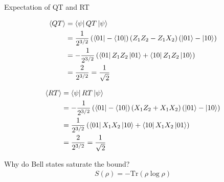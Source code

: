 \documentclass[aspectratio=1610]{beamer}					%
\begin{document}
\begin{frame}{Expectation of QT and RT}

\begin{align*}
\langle QT \rangle &= \bra{\psi}QT\ket{\psi}\\
&= \frac{1}{2^{3/2}}\left(\bra{01} - \bra{10}\right) \left(Z_{1}Z_{2}-Z_{1}X_{2}\right)\left(\ket{01} - \ket{10}\right)\\
&= -\frac{1}{2^{3/2}}\left(\bra{01}Z_{1}Z_{2}\ket{01} + \bra{10}Z_{1}Z_{2}\ket{10}\right)\\
&= \frac{2}{2^{3/2}} = \frac{1}{\sqrt{2}}
\end{align*}

\begin{align*}
\langle RT \rangle &= \bra{\psi}RT\ket{\psi}\\
&= -\frac{1}{2^{3/2}}\left(\bra{01} - \bra{10}\right) \left(X_{1}Z_{2}+X_{1}X_{2}\right)\left(\ket{01} - \ket{10}\right)\\
&= \frac{1}{2^{3/2}}\left(\bra{01}X_{1}X_{2}\ket{10} + \bra{10}X_{1}X_{2}\ket{01}\right)\\
&= \frac{2}{2^{3/2}} = \frac{1}{\sqrt{2}}
\end{align*}

\end{frame}

\begin{frame}{Why do Bell states saturate the bound?}
\begin{align*}
S(\rho) = -\mathrm{Tr}(\rho\log\rho)
\end{align*}
\end{frame}
\end{document}
